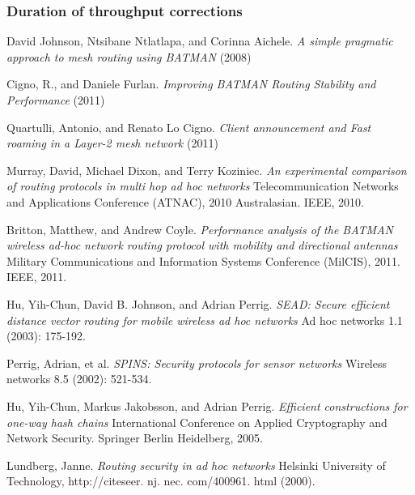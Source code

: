 \documentclass[11pt]{article}
\begin{document}
\subsubsection{Duration of throughput corrections}


\medskip


\begin{thebibliography}{1}
	
	
	
	David Johnson, Ntsibane Ntlatlapa, and Corinna Aichele.
	\textit{A simple pragmatic approach to mesh routing using BATMAN} (2008)
	
	Cigno, R., and Daniele Furlan.
	\textit{Improving BATMAN Routing Stability and Performance} (2011)
	
	Quartulli, Antonio, and Renato Lo Cigno.
	\textit{Client announcement and Fast roaming in a Layer-2 mesh network} (2011)
	
	Murray, David, Michael Dixon, and Terry Koziniec.
	\textit{An experimental comparison of routing protocols in multi hop ad hoc networks} Telecommunication Networks and Applications Conference (ATNAC), 2010 Australasian. IEEE, 2010.
	
	Britton, Matthew, and Andrew Coyle.
	\textit{Performance analysis of the BATMAN wireless ad-hoc network routing protocol with mobility and directional antennas} Military Communications and Information Systems Conference (MilCIS), 2011. IEEE, 2011.
	
	Hu, Yih-Chun, David B. Johnson, and Adrian Perrig. 
	\textit{SEAD: Secure efficient distance vector routing for mobile wireless ad hoc networks} Ad hoc networks 1.1 (2003): 175-192.
	
	Perrig, Adrian, et al. 
	\textit{SPINS: Security protocols for sensor networks} Wireless networks 8.5 (2002): 521-534.
	
	Hu, Yih-Chun, Markus Jakobsson, and Adrian Perrig. 
	\textit{Efficient constructions for one-way hash chains} International Conference on Applied Cryptography and Network Security. Springer Berlin Heidelberg, 2005.
	
	Lundberg, Janne. 
	\textit{Routing security in ad hoc networks} Helsinki University of Technology, http://citeseer. nj. nec. com/400961. html (2000).
	
\end{thebibliography}
\end{document}
